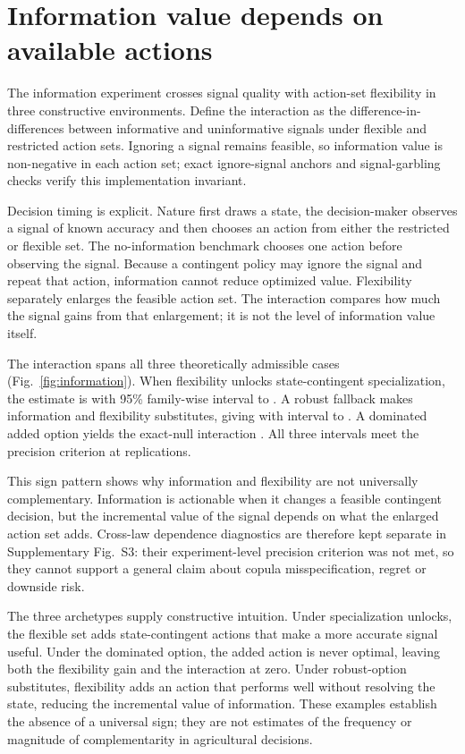 \section{Information value depends on available actions}

The information experiment crosses signal quality with action-set flexibility in three constructive environments. Define the interaction as the difference-in-differences between informative and uninformative signals under flexible and restricted action sets. Ignoring a signal remains feasible, so information value is non-negative in each action set; exact ignore-signal anchors and signal-garbling checks verify this implementation invariant.

Decision timing is explicit. Nature first draws a state, the decision-maker observes a signal of known accuracy and then chooses an action from either the restricted or flexible set. The no-information benchmark chooses one action before observing the signal. Because a contingent policy may ignore the signal and repeat that action, information cannot reduce optimized value. Flexibility separately enlarges the feasible action set. The interaction compares how much the signal gains from that enlargement; it is not the level of information value itself.

The interaction spans all three theoretically admissible cases (Fig.~\ref{fig:information}). When flexibility unlocks state-contingent specialization, the estimate is \EsixPositive{} with 95\% family-wise interval \EsixPositiveLow{} to \EsixPositiveHigh{}. A robust fallback makes information and flexibility substitutes, giving \EsixSubstitution{} with interval \EsixSubstitutionLow{} to \EsixSubstitutionHigh{}. A dominated added option yields the exact-null interaction \EsixNull{}. All three intervals meet the precision criterion at \EsixReplications{} replications.

This sign pattern shows why information and flexibility are not universally complementary. Information is actionable when it changes a feasible contingent decision, but the incremental value of the signal depends on what the enlarged action set adds. Cross-law dependence diagnostics are therefore kept separate in Supplementary Fig.~S3: their experiment-level precision criterion was not met, so they cannot support a general claim about copula misspecification, regret or downside risk.

The three archetypes supply constructive intuition. Under specialization unlocks, the flexible set adds state-contingent actions that make a more accurate signal useful. Under the dominated option, the added action is never optimal, leaving both the flexibility gain and the interaction at zero. Under robust-option substitutes, flexibility adds an action that performs well without resolving the state, reducing the incremental value of information. These examples establish the absence of a universal sign; they are not estimates of the frequency or magnitude of complementarity in agricultural decisions.

